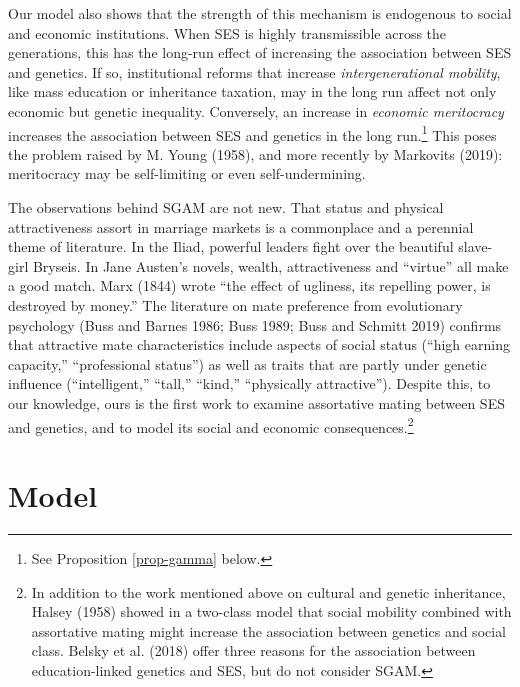\documentclass[
  12pt,
]{article}
\theoremstyle{definition}
\theoremstyle{definition}
\theoremstyle{definition}
\theoremstyle{definition}
\theoremstyle{remark}
\begin{document}
Our model also shows that the strength of this mechanism is endogenous to
social and economic institutions. When SES is highly transmissible across the
generations, this has the long-run effect of increasing the association between
SES and genetics. If so, institutional reforms that increase \emph{intergenerational
mobility}, like mass education or inheritance taxation, may in the long run
affect not only economic but genetic inequality. Conversely, an increase in
\emph{economic meritocracy} increases the association between SES and genetics in the
long run.\footnote{See Proposition \ref{prop-gamma} below.} This poses the problem raised by M. Young (1958), and more
recently by Markovits (2019): meritocracy may be self-limiting or even
self-undermining.

The observations behind SGAM are not new. That status and physical
attractiveness assort in marriage markets is a commonplace and a perennial theme
of literature. In the Iliad, powerful leaders fight over the beautiful
slave-girl Bryseis. In Jane Austen's novels, wealth, attractiveness and ``virtue''
all make a good match. Marx (1844) wrote ``the effect of ugliness, its repelling
power, is destroyed by money.'' The literature on mate preference from evolutionary
psychology (Buss and Barnes 1986; Buss 1989; Buss and Schmitt 2019) confirms
that attractive mate characteristics include aspects of social status (``high
earning capacity,'' ``professional status'') as well as traits that are partly
under genetic influence (``intelligent,'' ``tall,'' ``kind,'' ``physically
attractive''). Despite this, to our knowledge, ours is the first work to examine
assortative mating between SES and genetics, and to model its social and
economic consequences.\footnote{In addition to the work mentioned above on cultural and
  genetic inheritance, Halsey (1958) showed in a two-class model that
  social mobility combined with assortative mating might increase the association
  between genetics and social class. Belsky et al. (2018) offer three reasons for
  the association between education-linked genetics and SES, but do not consider
  SGAM.}

\hypertarget{model}{%
\section{Model}\label{model}}
\end{document}
